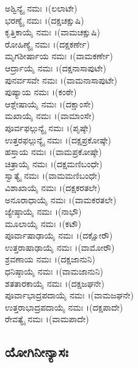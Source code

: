  ಅಶ್ವಿನ್ಯೈ ನಮಃ ।(ಲಲಾಟೇ)\\
 ಭರಣ್ಯೈ ನಮಃ ।(ದಕ್ಷಚಕ್ಷುಷಿ)\\
ಕೃತ್ತಿಕಾಯೈ ನಮಃ ।(ವಾಮಚಕ್ಷುಷಿ)\\
ರೋಹಿಣ್ಯೈ ನಮಃ ।(ದಕ್ಷಕರ್ಣೇ)\\
ಮೃಗಶೀರ್ಷಾಯ ನಮಃ ।(ವಾಮಕರ್ಣೇ)\\
ಆರ್ದ್ರಾಯೈ ನಮಃ ।(ದಕ್ಷನಾಸಾಪುಟೇ)\\
 ಪುನರ್ವಸವೇ ನಮಃ ।(ವಾಮನಾಸಾಪುಟೇ)\\
ಪುಷ್ಯಾಯ ನಮಃ ।(ಕಂಠೇ)\\
 ಆಶ್ಲೇಷಾಯೈ ನಮಃ ।(ದಕ್ಷಾಂಸೇ)\\
 ಮಖಾಯೈ ನಮಃ ।(ವಾಮಾಂಸೇ)\\
ಪೂರ್ವಫಲ್ಗುನ್ಯೈ ನಮಃ ।(ಪೃಷ್ಠೇ)\\
 ಉತ್ತರಫಲ್ಗುನ್ಯೈ ನಮಃ ।(ದಕ್ಷಪ್ರಕೋಷ್ಠೇ)\\
 ಹಸ್ತಾಯ ನಮಃ ।(ವಾಮಪ್ರಕೋಷ್ಠೇ)\\
ಚಿತ್ರಾಯೈ ನಮಃ ।(ದಕ್ಷಮಣಿಬಂಧೇ)\\
ಸ್ವಾತ್ಯೈ ನಮಃ ।(ವಾಮಮಣಿಬಂಧೇ)\\
 ವಿಶಾಖಾಯೈ ನಮಃ ।(ದಕ್ಷಕರತಲೇ)\\
 ಅನೂರಾಧಾಯೈ ನಮಃ ।(ವಾಮಕರತಲೇ)\\
ಜ್ಯೇಷ್ಠಾಯೈ ನಮಃ ।(ನಾಭೌ)\\
 ಮೂಲಾಯೈ ನಮಃ ।(ಕಟೌ)\\
 ಪೂರ್ವಾಷಾಢಾಯೈ ನಮಃ ।(ದಕ್ಷೋರೌ)\\
ಉತ್ತರಾಷಾಢಾಯೈ ನಮಃ ।(ವಾಮೋರೌ)\\
ಶ್ರವಣಾಯ ನಮಃ ।(ದಕ್ಷಜಾನುನಿ)\\
 ಧನಿಷ್ಠಾಯೈ ನಮಃ ।(ವಾಮಜಾನುನಿ)\\
 ಶತತಾರಕಾಯೈ ನಮಃ ।(ದಕ್ಷಜಘನೇ)\\
 ಪೂರ್ವಾಭಾದ್ರಪದಾಯೈ ನಮಃ ।(ವಾಮಜಘನೇ)\\
  ಉತ್ತರಾಭಾದ್ರಪದಾಯೈ ನಮಃ ।(ದಕ್ಷಪಾದೇ)\\
ರೇವತ್ಯೈ ನಮಃ ।(ವಾಮಪಾದೇ)
\subsection{ಯೋಗಿನೀನ್ಯಾಸಃ}

